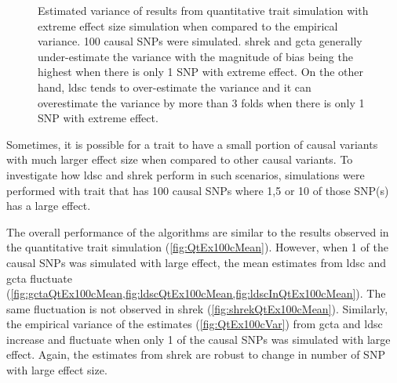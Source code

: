 \documentclass[12pt]{scrbook}
\begin{document}
\begin{figure}
{		
		\label{fig:ldscInQtEx100cVarCom}
	}
	\caption[Estimation of Variance in Extreme Effect Size Simulation]
	{Estimated variance of results from quantitative trait simulation with extreme effect size simulation when compared to the empirical variance.
		100 causal \glspl{SNP} were simulated.
		\gls{shrek} and \gls{gcta} generally under-estimate the variance with the magnitude of bias being the highest when there is only 1 \gls{SNP} with extreme effect.
		On the other hand, \gls{ldsc} tends to over-estimate the variance and it can overestimate the variance by more than 3 folds when there is only 1 \gls{SNP} with extreme effect.
	} 
	\label{fig:QtEx100cVarCom}
\end{figure}

Sometimes, it is possible for a trait to have a small portion of causal variants with much larger effect size when compared to other causal variants.
To investigate how \gls{ldsc} and \gls{shrek} perform in such scenarios, simulations were performed with trait that has 100 causal \glspl{SNP} where 1,5 or 10 of those \gls{SNP}(s) has a large effect.

The overall performance of the algorithms are similar to the results observed in the quantitative trait simulation (\cref{fig:QtEx100cMean}).
However, when 1 of the causal \glspl{SNP} was simulated with large effect, the mean estimates from \gls{ldsc} and \gls{gcta} fluctuate (\cref{fig:gctaQtEx100cMean,fig:ldscQtEx100cMean,fig:ldscInQtEx100cMean}).
The same fluctuation is not observed in \gls{shrek} (\cref{fig:shrekQtEx100cMean}). 
Similarly, the empirical variance of the estimates (\cref{fig:QtEx100cVar}) from \gls{gcta} and \gls{ldsc} increase and fluctuate when only 1 of the causal \glspl{SNP} was simulated with large effect.
Again, the estimates from \gls{shrek} are robust to change in number of \gls{SNP} with large effect size.
\end{document}
